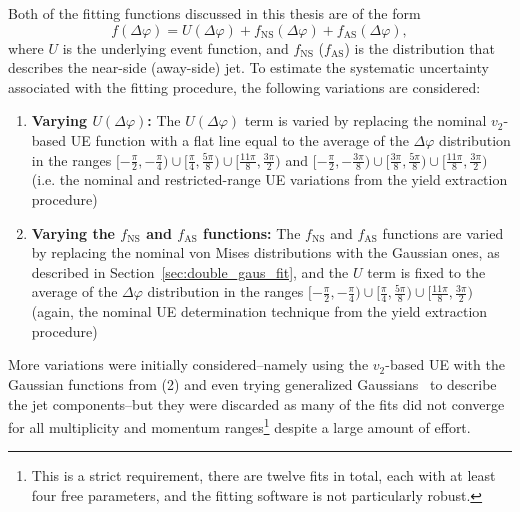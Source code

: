 Both of the fitting functions discussed in this thesis are of the form
%
\begin{equation}
    \label{eq:fit_function_form}
    f(\Delta\varphi) = U(\Delta\varphi) + f_{\text{NS}}(\Delta\varphi) + f_{\text{AS}}(\Delta\varphi),
\end{equation}
%
where $U$ is the underlying event function, and $f_{\text{NS}}$ ($f_{\text{AS}}$) is the distribution that describes the near-side (away-side) jet. To estimate the systematic uncertainty associated with the fitting procedure, the following variations are considered:
%
\begin{enumerate}
    \item \textbf{Varying $U(\Delta\varphi)$:} The $U(\Delta\varphi)$ term is varied by replacing the nominal $v_{2}$-based UE function with a flat line equal to the average of the $\Delta\varphi$ distribution in the ranges $[-\frac{\pi}{2}, -\frac{\pi}{4}) \cup [\frac{\pi}{4}, \frac{5\pi}{8}) \cup [\frac{11\pi}{8}, \frac{3\pi}{2})$ and $[-\frac{\pi}{2}, -\frac{3\pi}{8}) \cup [\frac{3\pi}{8}, \frac{5\pi}{8}) \cup [\frac{11\pi}{8}, \frac{3\pi}{2})$ (i.e. the nominal and restricted-range UE variations from the yield extraction procedure)
    \item \textbf{Varying the $f_{\text{NS}}$ and $f_{\text{AS}}$ functions:} The $f_{\text{NS}}$ and $f_{\text{AS}}$ functions are varied by replacing the nominal von Mises distributions with the Gaussian ones, as described in Section~\ref{sec:double_gaus_fit}, and the $U$ term is fixed to the average of the $\Delta\varphi$ distribution in the ranges $[-\frac{\pi}{2}, -\frac{\pi}{4}) \cup [\frac{\pi}{4}, \frac{5\pi}{8}) \cup [\frac{11\pi}{8}, \frac{3\pi}{2})$ (again, the nominal UE determination technique from the yield extraction procedure)
\end{enumerate}
%
More variations were initially considered--namely using the $v_{2}$-based UE with the Gaussian functions from (2) and even trying generalized Gaussians~\cite{GeneralizedGaus} to describe the jet components--but they were discarded as many of the fits did not converge for all multiplicity and momentum ranges\footnote{This is a strict requirement, there are twelve fits in total, each with at least four free parameters, and the fitting software is not particularly robust.} despite a large amount of effort.


